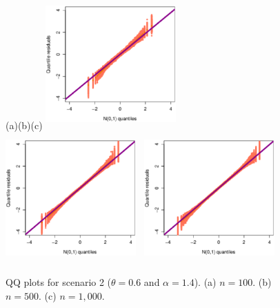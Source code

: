 \documentclass[12pt]{article}
\begin{document}
		\begin{figure}[htb!]
			\begin{center}
				(a)\hspace{4.5cm}(b)\hspace{4.5cm}(c)
				\includegraphics[width=5cm,height=5cm]{n_100_theta_0_6_alpha_1_4.eps}~
				\includegraphics[width=5cm,height=5cm]{n_500_theta_0_6_alpha_1_4.eps}~
				\includegraphics[width=5cm,height=5cm]{n_1000_theta_0_6_alpha_1_4.eps}
				\caption{QQ plots for scenario 2 ($\theta=0.6$ and $\alpha=1.4$). (a) $n=100$. (b) $n=500$. (c) $n = 1,000$.}\label{graf_simulacao_regressao_theta_0_6_alpha_1_4}
			\end{center}
		\end{figure}
		
\end{document}
